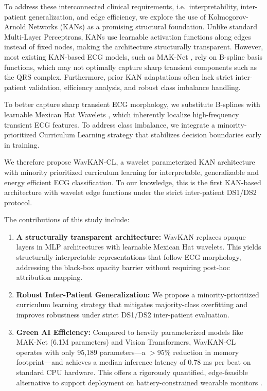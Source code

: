 \documentclass[journal,twoside,web]{ieeecolor}
\begin{document}
To address these interconnected clinical requirements, i.e.\ interpretability, inter-patient generalization, and edge efficiency, we explore the use of Kolmogorov-Arnold Networks (KANs) \cite{liu_kan_2024} as a promising structural foundation. Unlike standard Multi-Layer Perceptrons, KANs use learnable activation functions along edges instead of fixed nodes, making the architecture structurally transparent. However, most existing KAN-based ECG models, such as MAK-Net \cite{zhao_mak-net_2025}, rely on B-spline basis functions, which may not optimally capture sharp transient components such as the QRS complex. Furthermore, prior KAN adaptations often lack strict inter-patient validation, efficiency analysis, and robust class imbalance handling.

To better capture sharp transient ECG morphology, we substitute B-splines with learnable Mexican Hat Wavelets \cite{addison_wavelet_2005, bozorgasl_liu_2024}, which inherently localize high-frequency transient ECG features. To address class imbalance, we integrate a minority-prioritized Curriculum Learning strategy \cite{bengio_curriculum_2009, schmale_curriculum_2025} that stabilizes decision boundaries early in training.

We therefore propose WavKAN-CL, a wavelet parameterized KAN architecture with minority prioritized curriculum learning for interpretable, generalizable and energy efficient ECG classification. To our knowledge, this is the first KAN-based architecture with wavelet edge functions under the strict inter-patient DS1/DS2 protocol.

The contributions of this study include:
\begin{enumerate}
    \item \textbf{A structurally transparent architecture:} WavKAN replaces opaque layers in MLP architectures with learnable Mexican Hat wavelets. This yields structurally interpretable representations that follow ECG morphology, addressing the black-box opacity barrier without requiring post-hoc attribution mapping.
    \item \textbf{Robust Inter-Patient Generalization:} We propose a minority-prioritized curriculum learning strategy that mitigates majority-class overfitting and improves robustness under strict DS1/DS2 inter-patient evaluation. 
    \item \textbf{Green AI Efficiency:} Compared to heavily parameterized models like MAK-Net (6.1M parameters) and Vision Transformers, WavKAN-CL operates with only 95,189 parameters---a $>$95\% reduction in memory footprint---and achieves a median inference latency of 0.78 ms per beat on standard CPU hardware. This offers a rigorously quantified, edge-feasible alternative to support deployment on battery-constrained wearable monitors \cite{farag_tiny_2023, elsheikhy_lightweight_2025}.
\end{enumerate}
\end{document}
